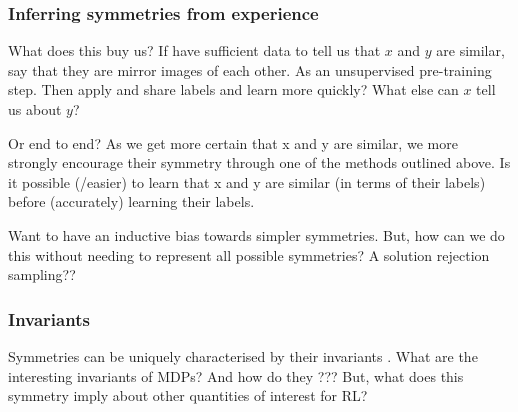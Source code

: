 \subsubsection{Inferring symmetries from experience}



What does this buy us? If have sufficient data to tell us that $x$ and $y$ are
similar, say that they are mirror images of each other.
As an unsupervised pre-training step. Then apply and share labels and learn more quickly?
What else can $x$ tell us about $y$?

\cite{Yang2019}

Or end to end? As we get more certain that x and y are similar, we more strongly
encourage their symmetry through one of the methods outlined above.
Is it possible (/easier) to learn that x and y are similar (in terms of their labels) before (accurately) learning their labels.



Want to have an inductive bias towards simpler symmetries. But, how can we do this without needing to represent all possible symmetries?
A solution rejection sampling??


%




\subsubsection{Invariants}

Symmetries can be uniquely characterised by their invariants \cite{PeterOlver1999}.
What are the interesting invariants of MDPs? And how do they ???
But, what does this symmetry imply about other quantities of interest for RL?

